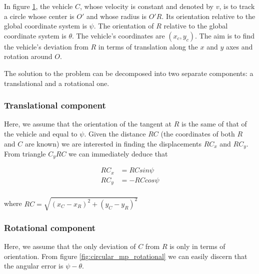 In figure \ref{fig:circular_mpc}, the vehicle $C$, whose velocity is constant
and denoted by $v$, is to track a circle whose center is $O'$ and whose
radius is $O'R$. Its orientation relative to the global coordinate system is
$\psi$. The orientation of $R$ relative to the global coordinate system is
$\theta$. The vehicle's coordinates are $(x_c, y_c)$. The aim is to find the
vehicle's deviation from $R$ in terms of translation along the $x$ and $y$ axes
and rotation around $O$.

\begin{figure}[H]\centering
  \scalebox{0.8}{}
  \caption{}
  \label{fig:circular_mpc}
\end{figure}

The solution to the problem can be decomposed into two separate components:
a translational and a rotational one.

\subsubsection{Translational component}

Here, we assume that the orientation of the tangent at $R$ is the same of that
of the vehicle and equal to $\psi$. Given the distance $RC$ (the coordinates of
both $R$ and $C$ are known) we are interested in finding the displacements
$RC_x$ and $RC_y$. From triangle $C_yRC$ we can immediately deduce that

\begin{align}
  RC_x &= RC sin\psi \\
  RC_y &= -RC cos\psi \\
\end{align}

where $RC = \sqrt{(x_C - x_R)^2 + (y_C - y_R)^2}$

\begin{figure}[H]\centering
  \scalebox{0.8}{}
  \caption{}
  \label{}
\end{figure}


\subsubsection{Rotational component}

Here, we assume that the only deviation of $C$ from $R$ is only in terms of
orientation. From figure \ref{fig:circular_mp_rotational} we can easily
discern that the angular error is $\psi-\theta$.

